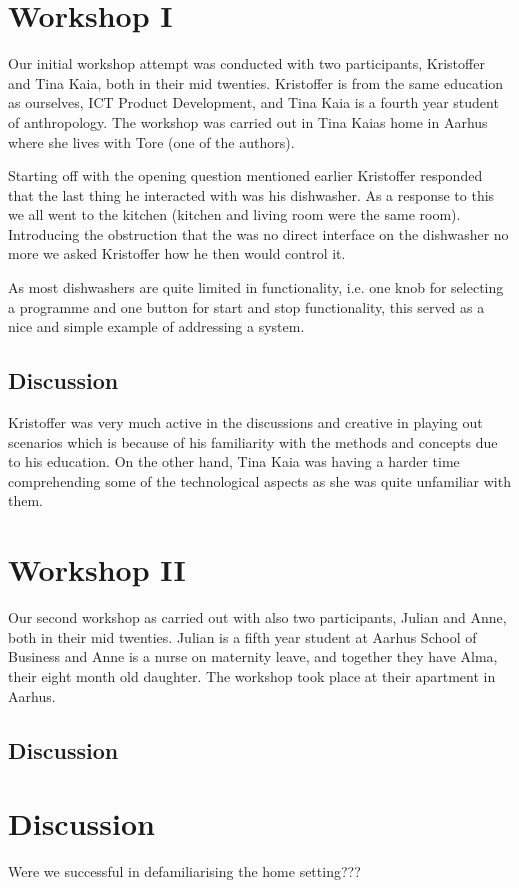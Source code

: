\section{Workshop I}

Our initial workshop attempt was conducted with two participants, Kristoffer and Tina Kaia, both in their mid twenties.
Kristoffer is from the same education as ourselves, ICT Product Development, and Tina Kaia is a fourth year student of anthropology.
The workshop was carried out in Tina Kaias home in Aarhus where she lives with Tore (one of the authors).

Starting off with the opening question mentioned earlier Kristoffer responded that the last thing he interacted with was his dishwasher.
As a response to this we all went to the kitchen (kitchen and living room were the same room).
Introducing the obstruction that the was no direct interface on the dishwasher no more we asked Kristoffer how he then would control it.

As most dishwashers are quite limited in functionality, i.e. one knob for selecting a programme and one button for start and stop functionality, this served as a nice and simple example of addressing a system.

\subsection{Discussion}

Kristoffer was very much active in the discussions and creative in playing out scenarios which is because of his familiarity with the methods and concepts due to his education.
On the other hand, Tina Kaia was having a harder time comprehending some of the technological aspects as she was quite unfamiliar with them.

\section{Workshop II}

Our second workshop as carried out with also two participants, Julian and Anne, both in their mid twenties.
Julian is a fifth year student at Aarhus School of Business and Anne is a nurse on maternity leave, and together they have Alma, their eight month old daughter.
The workshop took place at their apartment in Aarhus.

\subsection{Discussion}



\section{Discussion}

 Were we successful in defamiliarising the home setting???

